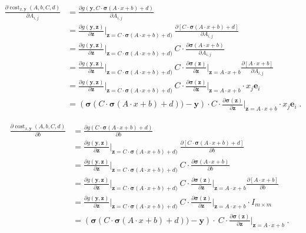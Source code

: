 \documentclass[12pt]{article}
\DeclareMathOperator{\cost}{cost}
\newcommand{\bsigma}{\pmb{\sigma}}
\newcommand{\y}{\mathbf{y}}
\newcommand{\z}{\mathbf{z}}
\newcommand{\e}{\mathbf{e}}
\begin{document}
\begin{align*}
\frac{\partial \cost_{x,\y}(A,b,C,d)}{\partial A_{i,j}}
& = \frac{\partial g(\y, C \cdot \bsigma(A \cdot x + b) + d)}{\partial A_{i,j}} \\
& = \frac{\partial g(\y, \z)}{\partial \z}\bigg|_{\z=C \cdot \bsigma(A \cdot x + b) + d)} \ \frac{\partial [C \cdot \bsigma(A \cdot x + b) + d]}{\partial A_{i,j}} \\
& = \frac{\partial g(\y, \z)}{\partial \z}\bigg|_{\z=C \cdot \bsigma(A \cdot x + b) + d)} \ C \cdot \frac{\partial \bsigma(A \cdot x + b)}{\partial A_{i,j}} \\
& = \frac{\partial g(\y, \z)}{\partial \z}\bigg|_{\z=C \cdot \bsigma(A \cdot x + b) + d)} \ C \cdot \frac{\partial \bsigma(\z)}{\partial \z} \bigg|_{\z=A \cdot x + b} \frac{\partial [A \cdot x + b]}{\partial A_{i,j}} \\
& = \frac{\partial g(\y, \z)}{\partial \z}\bigg|_{\z=C \cdot \bsigma(A \cdot x + b) + d)} \ C \cdot \frac{\partial \bsigma(\z)}{\partial \z} \bigg|_{\z=A \cdot x + b} \cdot x_j \e_i \\
& = \left(\bsigma(C \cdot \bsigma(A \cdot x + b) + d)) - \y \right) \cdot C \cdot \frac{\partial \bsigma(\z)}{\partial \z} \bigg|_{\z=A \cdot x + b} \cdot x_j \e_i \; .
\end{align*}

\begin{align*}
\frac{\partial \cost_{x,\y}(A,b,C,d)}{\partial b}
& = \frac{\partial g(C \cdot \bsigma(A \cdot x + b) + d)}{\partial b} \\
& = \frac{\partial g(\y, \z)}{\partial \z}\bigg|_{\z=C \cdot \bsigma(A \cdot x + b) + d)} \ \frac{\partial [C \cdot \bsigma(A \cdot x + b) + d]}{\partial b} \\
& = \frac{\partial g(\y, \z)}{\partial \z}\bigg|_{\z=C \cdot \bsigma(A \cdot x + b) + d)} \ C \cdot \frac{\partial \bsigma(A \cdot x + b)}{\partial b} \\
& = \frac{\partial g(\y, \z)}{\partial \z}\bigg|_{\z=C \cdot \bsigma(A \cdot x + b) + d)} \ C \cdot \frac{\partial \bsigma(\z)}{\partial \z} \bigg|_{\z=A \cdot x + b} \frac{\partial [A \cdot x + b]}{\partial b} \\
& = \frac{\partial g(\y, \z)}{\partial \z}\bigg|_{\z=C \cdot \bsigma(A \cdot x + b) + d)} \ C \cdot \frac{\partial \bsigma(\z)}{\partial \z} \bigg|_{\z=A \cdot x + b} \cdot I_{m \times m} \\
& = \left(\bsigma(C \cdot \bsigma(A \cdot x + b) + d))  - \y \right) \cdot \ C \cdot \frac{\partial \bsigma(\z)}{\partial \z} \bigg|_{\z=A \cdot x + b} \; .
\end{align*}
\end{document}
